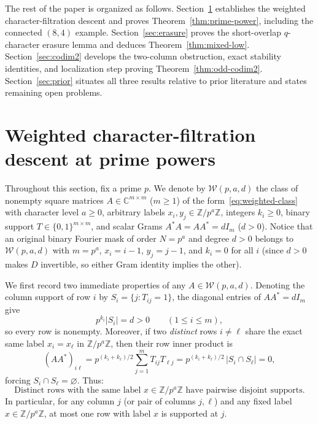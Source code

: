 \documentclass[11pt,reqno]{amsart}
\numberwithin{equation}{section}
\theoremstyle{definition}
\theoremstyle{remark}
\newcommand{\C}{\mathbb{C}}
\newcommand{\Z}{\mathbb{Z}}
\begin{document}
The rest of the paper is organized as follows. Section~\ref{sec:prime-power} establishes the weighted character-filtration descent and proves Theorem~\ref{thm:prime-power}, including the connected $(8,4)$ example. Section~\ref{sec:erasure} proves the short-overlap $q$-character erasure lemma and deduces Theorem~\ref{thm:mixed-low}. Section~\ref{sec:codim2} develops the two-column obstruction, exact stability identities, and localization step proving Theorem~\ref{thm:odd-codim2}. Section~\ref{sec:prior} situates all three results relative to prior literature and states remaining open problems.

\section{Weighted character-filtration descent at prime powers}
\label{sec:prime-power}

Throughout this section, fix a prime $p$. We denote by $\mathcal{W}(p,a,d)$ the class of nonempty square matrices $A\in\C^{m\times m}$ ($m\ge 1$) of the form~\eqref{eq:weighted-class} with character level $a\ge 0$, arbitrary labels $x_i,y_j\in\Z/p^a\Z$, integers $k_i\ge 0$, binary support $T\in\{0,1\}^{m\times m}$, and scalar Grams $A^*A=AA^*=dI_m$ ($d>0$). Notice that an original binary Fourier mask of order $N=p^a$ and degree $d>0$ belongs to $\mathcal{W}(p,a,d)$ with $m=p^a$, $x_i=i-1$, $y_j=j-1$, and $k_i=0$ for all $i$ (since $d>0$ makes $D$ invertible, so either Gram identity implies the other).

We first record two immediate properties of any $A\in\mathcal{W}(p,a,d)$. Denoting the column support of row $i$ by $S_i=\{j : T_{ij}=1\}$, the diagonal entries of $AA^*=dI_m$ give
\begin{equation}
\label{eq:row-norm}
p^{k_i}|S_i| = d > 0 \qquad (1\le i\le m),
\end{equation}
so every row is nonempty. Moreover, if two \emph{distinct} rows $i\neq\ell$ share the exact same label $x_i=x_\ell$ in $\Z/p^a\Z$, then their row inner product is
\[
(AA^*)_{i\ell} = p^{(k_i+k_\ell)/2}\sum_{j=1}^m T_{ij}T_{\ell j} = p^{(k_i+k_\ell)/2}\,|S_i\cap S_\ell| = 0,
\]
forcing $S_i\cap S_\ell = \varnothing$. Thus:
\begin{equation}
\label{eq:same-label-disjoint}
\text{Distinct rows with the same label } x\in\Z/p^a\Z \text{ have pairwise disjoint supports.}
\end{equation}
In particular, for any column $j$ (or pair of columns $j,\ell$) and any fixed label $x\in\Z/p^a\Z$, at most one row with label $x$ is supported at $j$.
\end{document}
